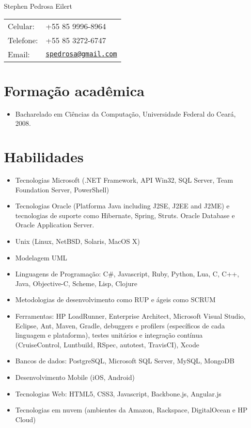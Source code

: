 \documentclass[letterpaper]{article}
\def\name{Stephen Pedrosa Eilert}
\begin{document}
\begin{flushright}

{\huge \name}


\vspace{0.25in}
\begin{minipage}{0.45\linewidth}
  \begin{tabular}{ll}
    Celular: & +55 85 9996-8964 \\
    Telefone: & +55 85 3272-6747 \\
    Email: & \href{mailto:spedrosa@gmail.com}{\tt spedrosa@gmail.com}
  \end{tabular}
\end{minipage}
\end{flushright}

\section*{Formação acadêmica}

\begin{itemize}
  \item Bacharelado em Ciências da Computação, Universidade Federal do Ceará, 2008.
\end{itemize}

\section*{Habilidades}
\begin{itemize}
  \item Tecnologias Microsoft (.NET Framework, API Win32, SQL Server, Team Foundation Server, PowerShell)
  \item Tecnologias Oracle (Platforma Java including J2SE, J2EE and J2ME) e tecnologias
    de suporte como Hibernate, Spring, Struts.
    Oracle Database e Oracle Application Server.
  \item Unix (Linux, NetBSD, Solaris, MacOS X)
  \item Modelagem UML
  \item Linguagens de Programação: C\#, Javascript, Ruby, Python, Lua, C, C++, Java, Objective-C, Scheme, Lisp, Clojure
  \item Metodologias de desenvolvimento como RUP e ágeis como SCRUM
  \item Ferramentas: HP LoadRunner, Enterprise Architect, Microsoft
Visual Studio, Eclipse, Ant, Maven, Gradle, debuggers e profilers (específicos de cada linguagem e plataforma),
testes unitários e integração contínua (CruiseControl, Luntbuild, RSpec, autotest, TravisCI), Xcode
  \item Bancos de dados: PostgreSQL, Microsoft SQL Server, MySQL, MongoDB
  \item Desenvolvimento Mobile (iOS, Android)
  \item Tecnologias Web: HTML5, CSS3, Javascript, Backbone.js, Angular.js
  \item Tecnologias em nuvem (ambientes da Amazon, Rackspace, DigitalOcean e HP Cloud)
\end{itemize}
\end{document}
